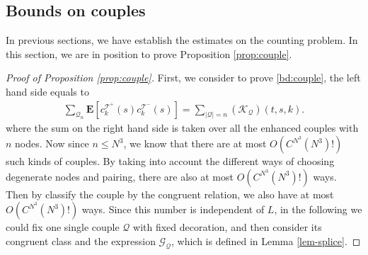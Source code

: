 \documentclass[UTF-8,reqno]{amsart}
\numberwithin{equation}{section}
\theoremstyle{definition}
\def\leq{\leqslant}
\def\leq{\leqslant}
\begin{document}
\subsection{Bounds on couples} \label{sec-boundoncouple}
In previous sections, we have establish the estimates on the counting problem. In this section, we are in position to prove  Proposition \ref{prop:couple}.
\begin{proof}[Proof of Proposition \ref{prop:couple}]
First, we consider to prove \eqref{bd:couple}, the left hand side equals to
     \begin{align}
     \sum_{\mathcal{Q}_{n}}\mathbf{E}[ c^{\mathcal{T}^+}_k (s)c^{\mathcal{T}^-}_k(s)] = \sum_{|\mathcal{Q}|=n}(\mathcal{K}_\mathcal{Q})(t,s,k).
 \end{align}
 where the sum on the right hand side is taken over all the enhanced couples with $n$ nodes. Now since $n\leq N^3$, we know that there are at most  $O(C^{N^3}(N^3)!)$ such kinds of couples. By taking into account the different ways of choosing degenerate nodes and pairing, there are also at most $O(C^{N^3}(N^3)!)$ ways.  Then by classify the couple by the congruent relation, we also have at most $O(C^{N^3}(N^3)!)$ ways. Since this number is independent of $L$, in the following we could fix one single couple $\mathcal{Q}$ with fixed decoration, and   then  consider its  congruent class and the expression $\mathcal{G}_{\mathcal{Q}}$, which is defined in Lemma \ref{lem-splice}.


\end{proof}
\end{document}

